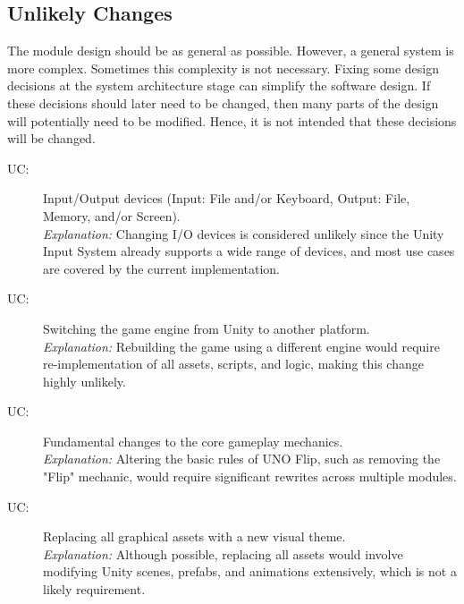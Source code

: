 \documentclass[12pt, titlepage]{article}
\newcounter{ucnum}
\newcommand{\uctheucnum}{UC\theucnum}
\begin{document}

\subsection{Unlikely Changes} \label{SecUchange}

The module design should be as general as possible. However, a general system is
more complex. Sometimes this complexity is not necessary. Fixing some design
decisions at the system architecture stage can simplify the software design. If
these decisions should later need to be changed, then many parts of the design
will potentially need to be modified. Hence, it is not intended that these
decisions will be changed.

\begin{description}
\item[ \uctheucnum \label{ucIO}:] Input/Output devices
  (Input: File and/or Keyboard, Output: File, Memory, and/or Screen). \\
  \textit{Explanation:} Changing I/O devices is considered unlikely since the Unity Input System already supports a wide range of devices, and most use cases are covered by the current implementation.

\item[ \uctheucnum \label{ucEngine}:] Switching the game engine from Unity to another platform. \\
  \textit{Explanation:} Rebuilding the game using a different engine would require re-implementation of all assets, scripts, and logic, making this change highly unlikely.

\item[ \uctheucnum \label{ucMechanics}:] Fundamental changes to the core gameplay mechanics. \\
  \textit{Explanation:} Altering the basic rules of UNO Flip, such as removing the "Flip" mechanic, would require significant rewrites across multiple modules.

\item[ \uctheucnum \label{ucAssets}:] Replacing all graphical assets with a new visual theme. \\
  \textit{Explanation:} Although possible, replacing all assets would involve modifying Unity scenes, prefabs, and animations extensively, which is not a likely requirement.
\end{description}
\end{document}
